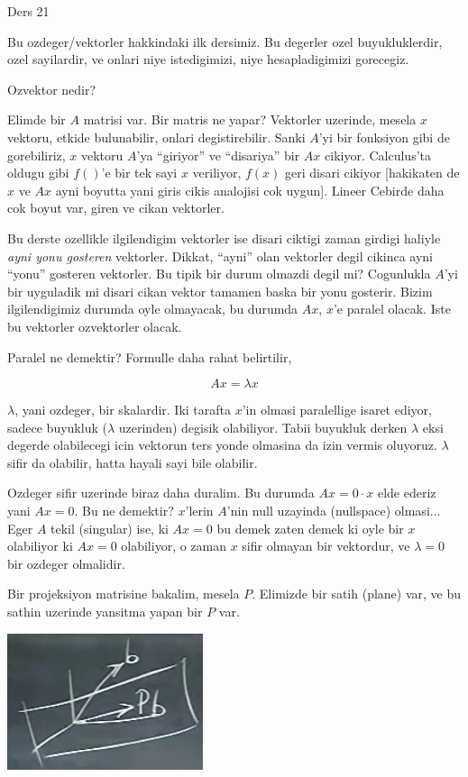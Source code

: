 \documentclass[12pt,fleqn]{article}\usepackage{../common}
\begin{document}
Ders 21

Bu ozdeger/vektorler hakkindaki ilk dersimiz. Bu degerler ozel
buyukluklerdir, ozel sayilardir, ve onlari niye istedigimizi, niye
hesapladigimizi gorecegiz.

Ozvektor nedir? 

Elimde bir $A$ matrisi var. Bir matris ne yapar? Vektorler uzerinde, mesela
$x$ vektoru, etkide bulunabilir, onlari degistirebilir. Sanki $A$'yi bir
fonksiyon gibi de gorebiliriz, $x$ vektoru $A$'ya ``giriyor'' ve
``disariya'' bir $Ax$ cikiyor. Calculus'ta oldugu gibi $f()$'e bir tek sayi
$x$ veriliyor, $f(x)$ geri disari cikiyor [hakikaten de $x$ ve $Ax$ ayni
boyutta yani giris cikis analojisi cok uygun]. Lineer Cebirde daha cok
boyut var, giren ve cikan vektorler.

Bu derste ozellikle ilgilendigim vektorler ise disari ciktigi zaman girdigi
haliyle {\em ayni yonu gosteren} vektorler. Dikkat, ``ayni'' olan vektorler
degil cikinca ayni ``yonu'' gosteren vektorler. Bu tipik bir durum olmazdi
degil mi? Cogunlukla $A$'yi bir uyguladik mi disari cikan vektor tamamen
baska bir yonu gosterir. Bizim ilgilendigimiz durumda oyle olmayacak, bu
durumda $Ax$, $x$'e paralel olacak. Iste bu vektorler ozvektorler olacak. 

Paralel ne demektir? Formulle daha rahat belirtilir,

$$ Ax = \lambda x $$

$\lambda$, yani ozdeger, bir skalardir. Iki tarafta $x$'in olmasi
paralellige isaret ediyor, sadece buyukluk ($\lambda$ uzerinden) degisik
olabiliyor. Tabii buyukluk derken $\lambda$ eksi degerde olabilecegi icin
vektorun ters yonde olmasina da izin vermis oluyoruz. $\lambda$ sifir da
olabilir, hatta hayali sayi bile olabilir.

Ozdeger sifir uzerinde biraz daha duralim. Bu durumda $Ax = 0 \cdot x$ elde
ederiz yani $Ax = 0$. Bu ne demektir? $x$'lerin $A$'nin null uzayinda
(nullspace) olmasi... Eger $A$ tekil (singular) ise, ki $Ax = 0$ bu demek
zaten demek ki oyle bir $x$ olabiliyor ki $Ax = 0$ olabiliyor, o zaman $x$
sifir olmayan bir vektordur, ve $\lambda = 0$ bir ozdeger olmalidir.

Bir projeksiyon matrisine bakalim, mesela $P$. Elimizde bir satih (plane)
var, ve bu sathin uzerinde yansitma yapan bir $P$ var. 

\includegraphics[height=4cm]{21_1.png}
\end{document}
